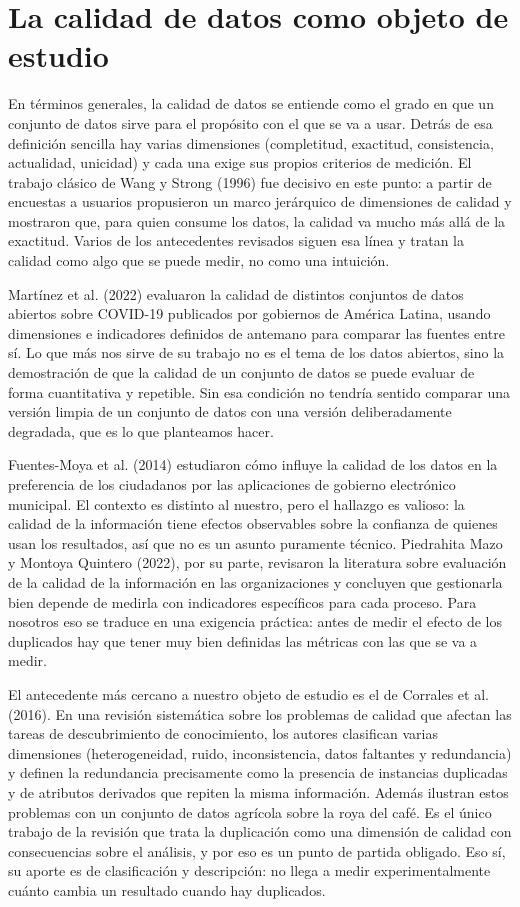\documentclass[11pt,openany,oneside,letterpaper]{book}
\begin{document}
\section{La calidad de datos como objeto de estudio}

En términos generales, la calidad de datos se entiende como el grado en que un conjunto de datos sirve para el propósito con el que se va a usar. Detrás de esa definición sencilla hay varias dimensiones (completitud, exactitud, consistencia, actualidad, unicidad) y cada una exige sus propios criterios de medición. El trabajo clásico de Wang y Strong (1996) fue decisivo en este punto: a partir de encuestas a usuarios propusieron un marco jerárquico de dimensiones de calidad y mostraron que, para quien consume los datos, la calidad va mucho más allá de la exactitud. Varios de los antecedentes revisados siguen esa línea y tratan la calidad como algo que se puede medir, no como una intuición.

Martínez et al. (2022) evaluaron la calidad de distintos conjuntos de datos abiertos sobre COVID-19 publicados por gobiernos de América Latina, usando dimensiones e indicadores definidos de antemano para comparar las fuentes entre sí. Lo que más nos sirve de su trabajo no es el tema de los datos abiertos, sino la demostración de que la calidad de un conjunto de datos se puede evaluar de forma cuantitativa y repetible. Sin esa condición no tendría sentido comparar una versión limpia de un conjunto de datos con una versión deliberadamente degradada, que es lo que planteamos hacer.

Fuentes-Moya et al. (2014) estudiaron cómo influye la calidad de los datos en la preferencia de los ciudadanos por las aplicaciones de gobierno electrónico municipal. El contexto es distinto al nuestro, pero el hallazgo es valioso: la calidad de la información tiene efectos observables sobre la confianza de quienes usan los resultados, así que no es un asunto puramente técnico. Piedrahita Mazo y Montoya Quintero (2022), por su parte, revisaron la literatura sobre evaluación de la calidad de la información en las organizaciones y concluyen que gestionarla bien depende de medirla con indicadores específicos para cada proceso. Para nosotros eso se traduce en una exigencia práctica: antes de medir el efecto de los duplicados hay que tener muy bien definidas las métricas con las que se va a medir.

El antecedente más cercano a nuestro objeto de estudio es el de Corrales et al. (2016). En una revisión sistemática sobre los problemas de calidad que afectan las tareas de descubrimiento de conocimiento, los autores clasifican varias dimensiones (heterogeneidad, ruido, inconsistencia, datos faltantes y redundancia) y definen la redundancia precisamente como la presencia de instancias duplicadas y de atributos derivados que repiten la misma información. Además ilustran estos problemas con un conjunto de datos agrícola sobre la roya del café. Es el único trabajo de la revisión que trata la duplicación como una dimensión de calidad con consecuencias sobre el análisis, y por eso es un punto de partida obligado. Eso sí, su aporte es de clasificación y descripción: no llega a medir experimentalmente cuánto cambia un resultado cuando hay duplicados.
\end{document}

